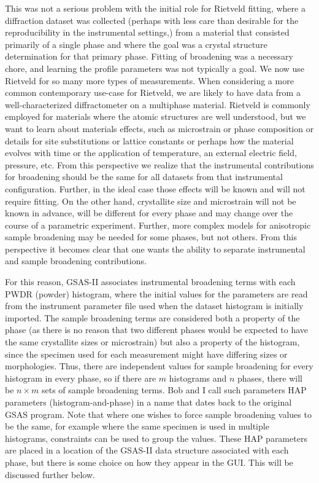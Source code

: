  This was not a serious problem with the initial role for Rietveld fitting, where a diffraction dataset was collected (perhaps with less care than desirable for the reproducibility in the instrumental settings,) from a material that consisted primarily of a single phase and where the goal was a crystal structure determination for that primary phase. Fitting of broadening was a necessary chore, and learning the profile parameters was not typically a goal. We now use Rietveld for so many more types of measurements. When considering a more common contemporary use-case for Rietveld, we are likely to have data from a well-characterized diffractometer on a multiphase material. Rietveld is commonly employed for materials where the atomic structures are well understood, but we want to learn about materials effects, such as microstrain or phase composition or details for site substitutions or lattice constants or perhaps how the material evolves with time or the application of temperature, an external electric field, pressure, etc. From this perspective we realize that the instrumental contributions for broadening should be the same for all datasets from that instrumental configuration. Further, in the ideal case those effects will be known and will not require fitting. On the other hand, crystallite size and microstrain will not be known in advance, will be different for every phase and may change over the course of a parametric experiment. Further, more complex models for anisotropic sample broadening may be needed for some phases, but not others. From this perspective it becomes clear that one wants the ability to separate instrumental and sample broadening contributions. 

 For this reason, GSAS-II associates instrumental broadening terms with each PWDR (powder) histogram, where the initial values for the parameters are read from the instrument parameter file used when the dataset histogram is initially imported. The sample broadening terms are considered both a property of the phase (as there is no reason that two different phases would be expected to have the same crystallite sizes or microstrain) but also a property of the histogram, since the specimen used for each measurement might have differing sizes or morphologies. Thus, there are independent values for sample broadening for every histogram in every phase, so if there are $m$ histograms and $n$ phases, there will be $n \times m$ sets of sample broadening terms. Bob and I call such parameters HAP parameters (histogram-and-phase) in a name that dates back to the original GSAS program. Note that where one wishes to force sample broadening values to be the same, for example where the same specimen is used in multiple histograms, constraints can be used to group the values. These HAP parameters are placed in a location of the GSAS-II data structure associated with each phase, but there is some choice on how they appear in the GUI. This will be discussed further below.

